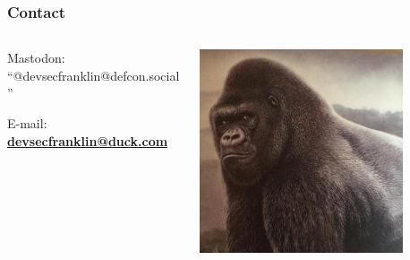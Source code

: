 \documentclass[aspectratio=169]{beamer}
\begin{document}
\begin{frame}
	\frametitle{Contact}
	\begin{columns}
		\begin{column}{0.5\textwidth}
			Mastodon: ``@devsecfranklin@defcon.social''
			\vspace{2mm}

			E-mail: \textbf{\href{mailto:devsecfranklin@duck.com}{devsecfranklin@duck.com}}
		\end{column}
		\begin{column}{0.5\textwidth}
			\begin{center}
				\includegraphics[width=0.785\textwidth]{../images/rilla.jpg}
			\end{center}
		\end{column}
	\end{columns}
\end{frame}
\end{document}
